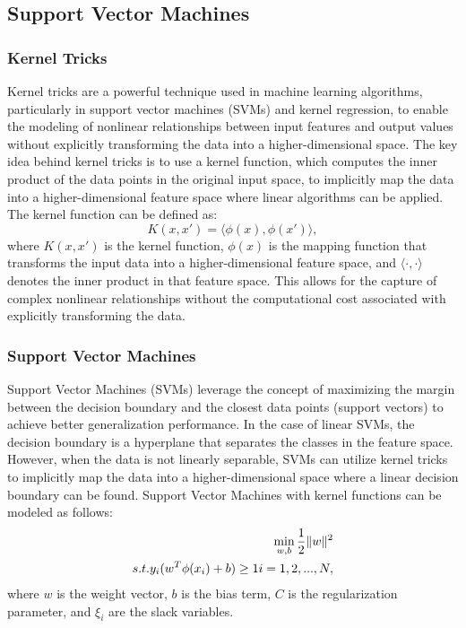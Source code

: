 \documentclass{article}
\begin{document}
\subsection{Support Vector Machines}

\subsubsection{Kernel Tricks}
Kernel tricks are a powerful technique used in machine learning algorithms, particularly in support vector machines (SVMs) and kernel regression, to enable the modeling of nonlinear relationships between input features and output values without explicitly transforming the data into a higher-dimensional space.
The key idea behind kernel tricks is to use a kernel function, which computes the inner product of the data points in the original input space, to implicitly map the data into a higher-dimensional feature space where linear algorithms can be applied.
The kernel function can be defined as:
\begin{equation}
    K(x, x') = \langle \phi(x), \phi(x') \rangle,
\end{equation}
where $K(x, x')$ is the kernel function, $\phi(x)$ is the mapping function that transforms the input data into a higher-dimensional feature space, and $\langle \cdot, \cdot \rangle$ denotes the inner product in that feature space.
This allows for the capture of complex nonlinear relationships without the computational cost associated with explicitly transforming the data.

\subsubsection{Support Vector Machines}
Support Vector Machines (SVMs) leverage the concept of maximizing the margin between the decision boundary and the closest data points (support vectors) to achieve better generalization performance.
In the case of linear SVMs, the decision boundary is a hyperplane that separates the classes in the feature space. However, when the data is not linearly separable, SVMs can utilize kernel tricks to implicitly map the data into a higher-dimensional space where a linear decision boundary can be found.
Support Vector Machines with kernel functions can be modeled as follows:
\begin{equation}
\begin{aligned}
    \min_{w, b} \frac{1}{2} \|w\|^2 \\ 
    s.t. \space y_i (w^T \phi(x_i) + b) \geq 1 \space i = 1, 2, ..., N,
\end{aligned}
\end{equation}
where $w$ is the weight vector, $b$ is the bias term, $C$ is the regularization parameter, and $\xi_i$ are the slack variables.
\end{document}

